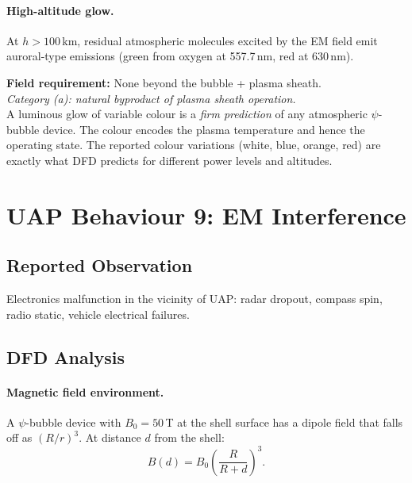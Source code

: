 \documentclass[12pt,a4paper]{article}
\begin{document}
\paragraph{High-altitude glow.}
At $h > 100$\,km, residual atmospheric molecules excited by the EM
field emit auroral-type emissions (green from oxygen at 557.7\,nm,
red at 630\,nm).

\begin{tcolorbox}[colback=green!5!white, colframe=green!60!black,
  title=Luminous Glow Assessment]
\textbf{Field requirement:} None beyond the bubble + plasma sheath.\\
\emph{Category (a): natural byproduct of plasma sheath operation.}\\[4pt]
A luminous glow of variable colour is a \emph{firm prediction} of any
atmospheric $\psi$-bubble device.  The colour encodes the plasma
temperature and hence the operating state.  The reported colour
variations (white, blue, orange, red) are exactly what DFD predicts
for different power levels and altitudes.
\end{tcolorbox}


\section{UAP Behaviour 9: EM Interference}\label{sec:emi}

\subsection{Reported Observation}

Electronics malfunction in the vicinity of UAP: radar dropout,
compass spin, radio static, vehicle electrical failures.

\subsection{DFD Analysis}

\paragraph{Magnetic field environment.}
A $\psi$-bubble device with $B_0 = 50$\,T at the shell surface
has a dipole field that falls off as $(R/r)^3$.  At distance $d$
from the shell:
\begin{equation}
B(d) = B_0\left(\frac{R}{R+d}\right)^3.
\end{equation}
\end{document}
